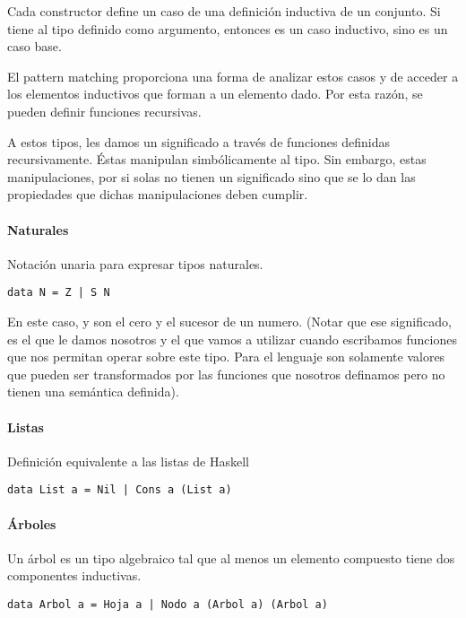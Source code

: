 Cada constructor define un caso de una definición inductiva de un conjunto. Si tiene al tipo definido como argumento, entonces es un caso inductivo, sino es un caso base.

El pattern matching proporciona una forma de analizar estos casos y de acceder a los elementos inductivos que forman a un elemento dado. Por esta razón, se pueden definir funciones recursivas.

A estos tipos, les damos un significado a través de funciones definidas recursivamente. Éstas manipulan simbólicamente al tipo. Sin embargo, estas manipulaciones, por si solas no tienen un significado sino que se lo dan las propiedades que dichas manipulaciones deben cumplir.

\paragraph{Naturales} Notación unaria para expresar tipos naturales.
\begin{centrado}
	\begin{verbatim}
data N = Z | S N
	\end{verbatim}
\end{centrado}
En este caso,  y  son el cero y el sucesor de un numero. (Notar que ese significado, es el que le damos nosotros y el que vamos a utilizar cuando escribamos funciones que nos permitan operar sobre este tipo. Para el lenguaje son solamente valores que pueden ser transformados por las funciones que nosotros definamos pero no tienen una semántica definida).

\paragraph{Listas} Definición equivalente a las listas de Haskell
\begin{centrado}
	\begin{verbatim}
data List a = Nil | Cons a (List a)
	\end{verbatim}
\end{centrado}

\paragraph{Árboles}
Un árbol es un tipo algebraico tal que al menos un elemento compuesto tiene dos componentes inductivas.

\begin{centrado}
	\begin{verbatim}
data Arbol a = Hoja a | Nodo a (Arbol a) (Arbol a)
	\end{verbatim}
\end{centrado}

